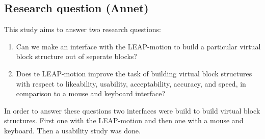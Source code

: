 \subsection{Research question (Annet)}
This study aims to answer two research questions:
\begin{enumerate}
\item Can we make an interface with the LEAP-motion to build a particular virtual block structure out of seperate blocks?
\item Does te LEAP-motion improve the task of building virtual block structures with respect to likeability, usability, acceptability, accuracy, and speed, in comparison to a mouse and keyboard interface?
\end{enumerate}
In order to answer these questions two interfaces were build to build virtual block structures. First one with the LEAP-motion and then one with a mouse and keyboard. Then a usability study was done.